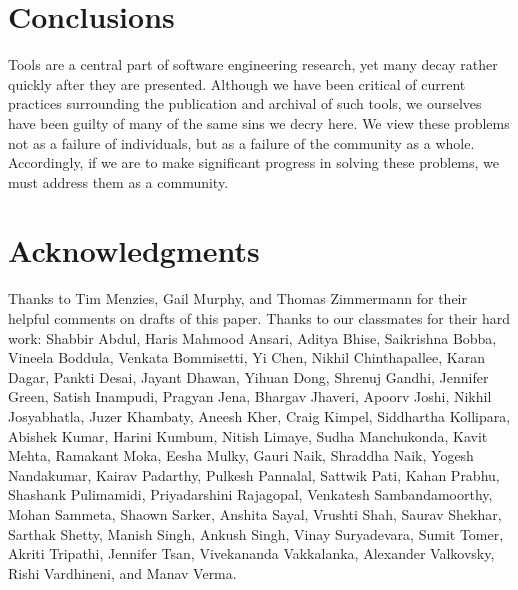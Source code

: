 \documentclass[10pt,conference]{IEEEtran}
\begin{document}
\section{Conclusions}

Tools are a central part of software engineering research,
yet many decay rather quickly after they are presented.
Although we have been critical of current practices surrounding
the publication and archival of such tools, we ourselves
have been guilty of many of the same sins we decry here.
We view these problems not as a failure of individuals, but
as a failure of the community as a whole.
Accordingly, if we are to make significant progress in solving
these problems, we must address them as a community.

\section*{Acknowledgments}

Thanks to Tim Menzies, Gail Murphy, and Thomas Zimmermann
for their helpful comments on drafts of this paper.  
Thanks to our classmates for their hard work: Shabbir Abdul, Haris Mahmood Ansari, Aditya Bhise, Saikrishna Bobba, Vineela Boddula, Venkata Bommisetti, Yi Chen, Nikhil Chinthapallee, Karan Dagar, Pankti Desai, Jayant Dhawan, Yihuan Dong, Shrenuj Gandhi, Jennifer Green, Satish Inampudi, Pragyan Jena, Bhargav Jhaveri, Apoorv Joshi, Nikhil Josyabhatla, Juzer Khambaty, Aneesh Kher, Craig Kimpel, Siddhartha Kollipara, Abishek Kumar, Harini Kumbum, Nitish Limaye, Sudha Manchukonda, Kavit Mehta, Ramakant Moka, Eesha Mulky, Gauri Naik, Shraddha Naik, Yogesh Nandakumar, Kairav Padarthy, Pulkesh Pannalal, Sattwik Pati, Kahan Prabhu, Shashank Pulimamidi, Priyadarshini Rajagopal, Venkatesh Sambandamoorthy, Mohan Sammeta, Shaown Sarker, Anshita Sayal, Vrushti Shah, Saurav Shekhar, Sarthak Shetty, Manish Singh, Ankush Singh, Vinay Suryadevara, Sumit Tomer, Akriti Tripathi, Jennifer Tsan, Vivekananda Vakkalanka, Alexander Valkovsky, Rishi Vardhineni, and Manav Verma.


 
\end{document}
